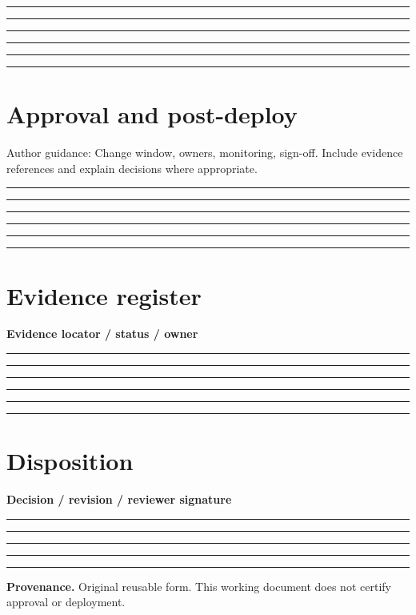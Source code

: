 \documentclass[11pt,letterpaper]{article}
\newcommand{\ResponseLine}{\par\vspace{1.05em}\noindent\rule{\linewidth}{0.4pt}\par}
\newcommand{\ResponseArea}{\ResponseLine\ResponseLine\ResponseLine}
\begin{document}
\ResponseArea\ResponseArea
\section{Approval and post-deploy}
Author guidance: Change window, owners, monitoring, sign-off. Include evidence references and explain decisions where appropriate.


\ResponseArea\ResponseArea
\section{Evidence register}
\textbf{Evidence locator / status / owner}\ResponseArea\ResponseArea
\section{Disposition}
\textbf{Decision / revision / reviewer signature}\ResponseArea\ResponseLine
\vfill
\hrule
{\footnotesize\textbf{Provenance.} Original reusable form. This working document does not certify approval or deployment.}
\end{document}
